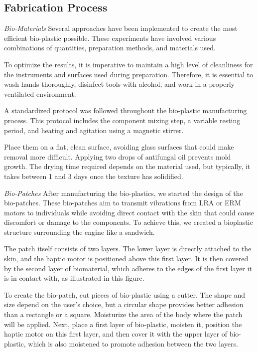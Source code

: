 \subsection{Fabrication Process}
\textit{Bio-Materials}
Several approaches have been implemented to create the most efficient bio-plastic possible. These experiments have involved various combinations of quantities, preparation methods, and materials used.

To optimize the results, it is imperative to maintain a high level of cleanliness for the instruments and surfaces used during preparation. Therefore, it is essential to wash hands thoroughly, disinfect tools with alcohol, and work in a properly ventilated environment.

A standardized protocol was followed throughout the bio-plastic manufacturing process. This protocol includes the component mixing step, a variable resting period, and heating and agitation using a magnetic stirrer.

Place them on a flat, clean surface, avoiding glass surfaces that could make removal more difficult. Applying two drops of antifungal oil prevents mold growth. The drying time required depends on the material used, but typically, it takes between 1 and 3 days once the texture has solidified.

\textit{Bio-Patches}
After manufacturing the bio-plastics, we started the design of the bio-patches. These bio-patches aim to transmit vibrations from LRA or ERM motors to individuals while avoiding direct contact with the skin that could cause discomfort or damage to the components. To achieve this, we created a bioplastic structure surrounding the engine like a sandwich.

The patch itself consists of two layers. The lower layer is directly attached to the skin, and the haptic motor is positioned above this first layer. It is then covered by the second layer of biomaterial, which adheres to the edges of the first layer it is in contact with, as illustrated in this figure.

To create the bio-patch, cut pieces of bio-plastic using a cutter. The shape and size depend on the user's choice, but a circular shape provides better adhesion than a rectangle or a square. Moisturize the area of the body where the patch will be applied. Next, place a first layer of bio-plastic, moisten it, position the haptic motor on this first layer, and then cover it with the upper layer of bio-plastic, which is also moistened to promote adhesion between the two layers.

